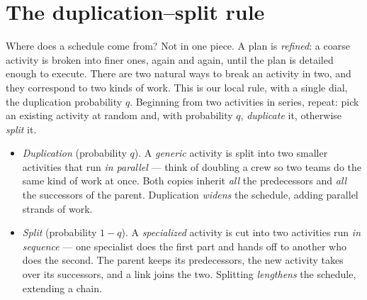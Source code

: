 \section{The duplication--split rule}

Where does a schedule come from? Not in one piece. A plan is \emph{refined}: a
coarse activity is broken into finer ones, again and again, until the plan is
detailed enough to execute. There are two natural ways to break an activity in
two, and they correspond to two kinds of work. This is our local rule, with a
single dial, the duplication probability $q$. Beginning from two activities in
series, repeat: pick an existing activity at random and, with probability $q$,
\emph{duplicate} it, otherwise \emph{split} it.
\begin{itemize}
  \item \emph{Duplication} (probability $q$). A \emph{generic} activity is split
    into two smaller activities that run \emph{in parallel} --- think of doubling
    a crew so two teams do the same kind of work at once. Both copies inherit
    \emph{all} the predecessors and \emph{all} the successors of the parent.
    Duplication \emph{widens} the schedule, adding parallel strands of work.
  \item \emph{Split} (probability $1-q$). A \emph{specialized} activity is cut
    into two activities run \emph{in sequence} --- one specialist does the first
    part and hands off to another who does the second. The parent keeps its
    predecessors, the new activity takes over its successors, and a link joins
    the two. Splitting \emph{lengthens} the schedule, extending a chain.
\end{itemize}
